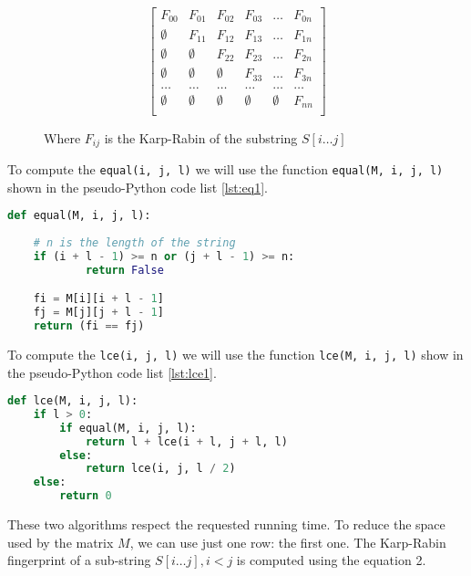 \documentclass{article}
\begin{document}
\begin{figure}[htp]
\begin{equation}
    \begin{bmatrix}
        F_{00}      & F_{01}    & F_{02} & F_{03} & \dots & F_{0n} \\
        \emptyset   & F_{11}    & F_{12} & F_{13} & \dots & F_{1n} \\
        \emptyset   & \emptyset & F_{22} & F_{23} & \dots & F_{2n} \\
        \emptyset   & \emptyset & \emptyset & F_{33} & \dots & F_{3n} \\
        \dots & \dots & \dots & \dots & \dots & \dots \\
        \emptyset   & \emptyset & \emptyset & \emptyset & \emptyset & F_{nn} \\
    \end{bmatrix}
\end{equation}
\caption{Where $F_{ij}$ is the Karp-Rabin of the substring $S[i \dots j]$}
\end{figure}

\noindent To compute the \verb+equal(i, j, l)+ we will use the function \verb+equal(M, i, j, l)+ shown in the pseudo-Python code list \ref{lst:eq1}.

\begin{lstlisting}[label={lst:eq1},caption="Function to compute the equality.",language=Python]
def equal(M, i, j, l):
    
    # n is the length of the string
    if (i + l - 1) >= n or (j + l - 1) >= n:
            return False

    fi = M[i][i + l - 1]
    fj = M[j][j + l - 1]
    return (fi == fj)
\end{lstlisting}

\noindent To compute the \verb+lce(i, j, l)+ we will use the function \verb+lce(M, i, j, l)+ show in the pseudo-Python code list \ref{lst:lce1}.

\begin{lstlisting}[label={lst:lce1},caption="Function to compute the longest common extension.",language=Python]
def lce(M, i, j, l):
    if l > 0:
        if equal(M, i, j, l):
            return l + lce(i + l, j + l, l)
        else:
            return lce(i, j, l / 2)
    else:
        return 0
\end{lstlisting}

\noindent These two algorithms respect the requested running time. To reduce the space used by the matrix $M$, we can use just one row: the first one. The Karp-Rabin fingerprint of a sub-string $S[i \dots j], i < j$ is computed using the equation 2.
\end{document}
